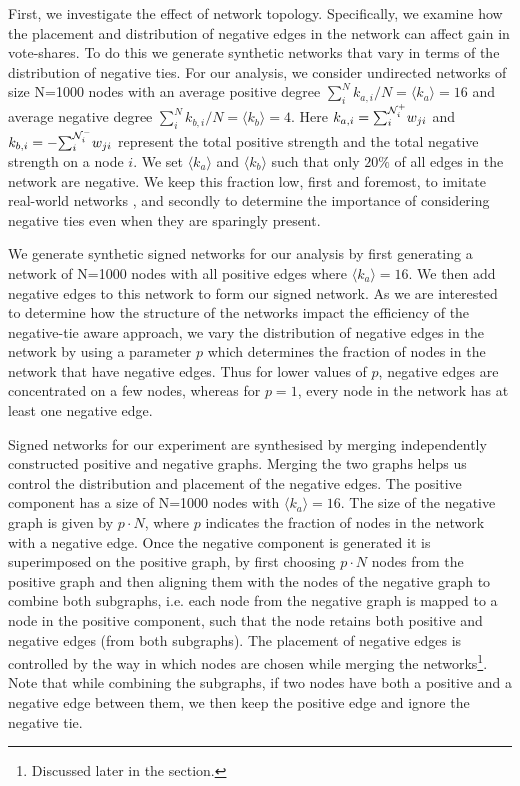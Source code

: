 First, we investigate the effect of network topology. Specifically, we examine how the placement and distribution of negative edges in the network can affect gain in vote-shares. To do this we generate synthetic networks that vary in terms of the distribution of negative ties. For our analysis, we consider undirected networks of size N=1000 nodes with an average positive degree ${\textstyle\sum}_{i}^N k_{a,i}/N = \langle k_{a} \rangle =16$ and average negative degree ${\textstyle\sum}_{i}^N k_{b,i}/N =\langle k_{b} \rangle =4$. Here $k_{a,i} = {\textstyle \sum}_{i}^{{\cal N}_{i}^+} w_{ji}$ and $k_{b,i} = - {\textstyle \sum}_{i}^{{\cal N}_{i}^-} w_{ji}$ represent the total positive strength and the total negative strength on a node $i$. We set $\langle k_{a} \rangle$ and $\langle k_{b} \rangle$ such that only $20\%$ of all edges in the network are negative. We keep this fraction low, first and foremost, to imitate real-world networks \cite{leskovec2010signed}, and secondly to determine the importance of considering negative ties even when they are sparingly present. 

We generate synthetic signed networks for our analysis by first generating a network of N=1000 nodes with all positive edges where $\langle k_{a} \rangle =16$. We then add negative edges to this network to form our signed network. As we are interested to determine how the structure of the networks impact the efficiency of the negative-tie aware approach, we vary the distribution of negative edges in the network by using a parameter $p$ which determines the fraction of nodes in the network that have negative edges. Thus for lower values of $p$, negative edges are concentrated on a few nodes, whereas for $p=1$, every node in the network has at least one negative edge.



Signed networks for our experiment are synthesised by merging independently constructed positive and negative graphs. Merging the two graphs helps us control the distribution and placement of the negative edges.
The positive component has a size of N=1000 nodes with $\langle k_{a} \rangle =16$. The size of the negative graph is given by $p \cdot N$, where $p$ indicates the fraction of nodes in the network with a negative edge. Once the negative component is generated it is superimposed on the positive graph, by first choosing $p\cdot N$ nodes from the positive graph and then aligning them with the nodes of the negative graph to combine both subgraphs, i.e. each node from the negative graph is mapped to a node in the positive component, such that the node retains both positive and negative edges (from both subgraphs). The placement of negative edges is controlled by the way in which nodes are chosen while merging the networks\footnote{Discussed later in the section.}. Note that while combining the subgraphs, if two nodes have both a positive and a negative edge between them, we then keep the positive edge and ignore the negative tie. 

